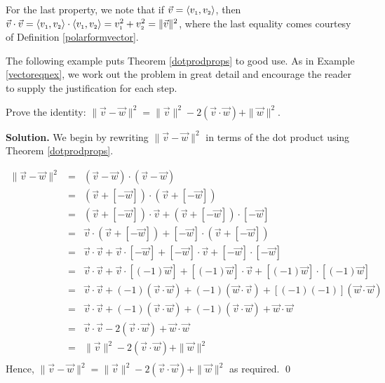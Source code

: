 For the last property, we note that if  $\vec{v} = \left<v_{\mbox{\tiny $1$}},v_{\mbox{\tiny $2$}}\right>$, then $\vec{v} \cdot \vec{v} = \left<v_{\mbox{\tiny $1$}},v_{\mbox{\tiny $2$}}\right> \cdot \left<v_{\mbox{\tiny $1$}},v_{\mbox{\tiny $2$}}\right> = v_{\mbox{\tiny $1$}}^2 + v_{\mbox{\tiny $2$}}^2 = \|\vec{v}\|^2$, where the last equality comes courtesy of Definition \ref{polarformvector}.

\smallskip

The following example puts Theorem \ref{dotprodprops} to good use.  As in Example \ref{vectoreqnex}, we work out the problem in great detail and encourage the reader to supply the justification for each step.

\begin{ex}  \label{dotprodpropex}  Prove the identity:  $\| \vec{v} - \vec{w} \|^2 =  \|\vec{v}\|^2  -2 (\vec{v}\cdot\vec{w}) + \|\vec{w}\|^2$.

\smallskip

{\bf Solution.} We begin by rewriting  $\| \vec{v} - \vec{w} \|^2$ in terms of the dot product using Theorem \ref{dotprodprops}.

\[ \begin{array}{rcl}

\| \vec{v} - \vec{w} \|^2 & = & (\vec{v} - \vec{w}) \cdot (\vec{v} - \vec{w})  \\ [3pt]
													& = & (\vec{v} + [-\vec{w}]) \cdot (\vec{v} + [-\vec{w}]) \\ [3pt]										
													& = &  (\vec{v} + [-\vec{w}]) \cdot \vec{v}  +(\vec{v} + [-\vec{w}]) \cdot [-\vec{w}]  \\ [3pt]		
													& = & \vec{v} \cdot (\vec{v} + [-\vec{w}])  + [-\vec{w}] \cdot (\vec{v} + [-\vec{w}]) \\ [3pt]
													& = & \vec{v} \cdot \vec{v} + \vec{v} \cdot [-\vec{w}] + [-\vec{w}]\cdot \vec{v} + [-\vec{w}]\cdot[-\vec{w}] \\ [3pt]
													& = & \vec{v} \cdot \vec{v} + \vec{v} \cdot [(-1)\vec{w}] + [(-1)\vec{w}]\cdot \vec{v} + [(-1)\vec{w}]\cdot[(-1)\vec{w}] \\ [3pt]	
													& = & \vec{v} \cdot \vec{v} + (-1)(\vec{v} \cdot \vec{w}) + (-1)(\vec{w} \cdot \vec{v}) + [(-1)(-1)](\vec{w}\cdot\vec{w}) \\ [3pt]	
													& = & \vec{v} \cdot \vec{v} + (-1)(\vec{v} \cdot \vec{w}) + (-1)(\vec{v} \cdot \vec{w}) + \vec{w}\cdot\vec{w} \\ [3pt]
												  & = & \vec{v} \cdot \vec{v} -2(\vec{v} \cdot \vec{w}) + \vec{w}\cdot\vec{w} \\ [3pt]
													& = & \|\vec{v}\|^2-2(\vec{v} \cdot \vec{w}) + \|\vec{w}\|^2 \\ \end{array} \]
Hence,  $\| \vec{v} - \vec{w} \|^2 =  \|\vec{v}\|^2  -2 (\vec{v}\cdot\vec{w}) + \|\vec{w}\|^2$ as required.  \qed

\end{ex} 

